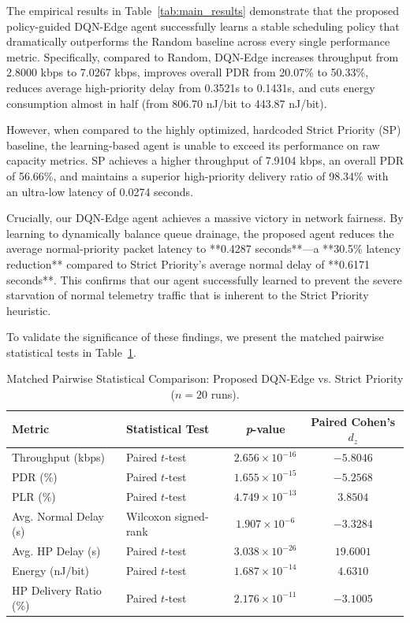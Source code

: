 \documentclass[runningheads,a4paper]{llncs}
\begin{document}
The empirical results in Table~\ref{tab:main_results} demonstrate that the proposed policy-guided DQN-Edge agent successfully learns a stable scheduling policy that dramatically outperforms the Random baseline across every single performance metric. Specifically, compared to Random, DQN-Edge increases throughput from 2.8000 kbps to 7.0267 kbps, improves overall PDR from 20.07\% to 50.33\%, reduces average high-priority delay from 0.3521s to 0.1431s, and cuts energy consumption almost in half (from 806.70 nJ/bit to 443.87 nJ/bit).

However, when compared to the highly optimized, hardcoded Strict Priority (SP) baseline, the learning-based agent is unable to exceed its performance on raw capacity metrics. SP achieves a higher throughput of 7.9104 kbps, an overall PDR of 56.66\%, and maintains a superior high-priority delivery ratio of 98.34\% with an ultra-low latency of 0.0274 seconds. 

Crucially, our DQN-Edge agent achieves a massive victory in network fairness. By learning to dynamically balance queue drainage, the proposed agent reduces the average normal-priority packet latency to **0.4287 seconds**—a **30.5\% latency reduction** compared to Strict Priority's average normal delay of **0.6171 seconds**. This confirms that our agent successfully learned to prevent the severe starvation of normal telemetry traffic that is inherent to the Strict Priority heuristic.

To validate the significance of these findings, we present the matched pairwise statistical tests in Table~\ref{tab:stats}.

\begin{table}[ht]
\centering
\caption{Matched Pairwise Statistical Comparison: Proposed DQN-Edge vs. Strict Priority ($n=20$ runs).}
\label{tab:stats}
\scriptsize
\begin{tabular}{llcc}
\toprule
\textbf{Metric} & \textbf{Statistical Test} & \textbf{\textit{p}-value} & \textbf{Paired Cohen's $d_z$} \\
\midrule
Throughput (kbps) & Paired $t$-test & $2.656 \times 10^{-16}$ & $-5.8046$ \\
PDR (\%) & Paired $t$-test & $1.655 \times 10^{-15}$ & $-5.2568$ \\
PLR (\%) & Paired $t$-test & $4.749 \times 10^{-13}$ & $3.8504$ \\
Avg. Normal Delay (s) & Wilcoxon signed-rank & $1.907 \times 10^{-6}$ & $-3.3284$ \\
Avg. HP Delay (s) & Paired $t$-test & $3.038 \times 10^{-26}$ & $19.6001$ \\
Energy (nJ/bit) & Paired $t$-test & $1.687 \times 10^{-14}$ & $4.6310$ \\
HP Delivery Ratio (\%) & Paired $t$-test & $2.176 \times 10^{-11}$ & $-3.1005$ \\
\bottomrule
\end{tabular}
\end{table}
\end{document}
